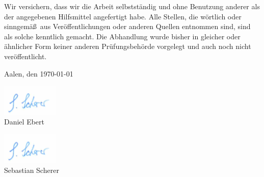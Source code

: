 \documentclass[12pt]{report}
\begin{document}
Wir versichern, dass wir die Arbeit selbstst\"andig und ohne Benutzung
anderer als der angegebenen Hilfsmittel angefertigt habe. Alle Stellen, die
w\"ortlich oder sinngem\"a\ss\ aus Ver\"offentlichungen oder anderen Quellen
entnommen sind, sind als solche kenntlich gemacht. Die Abhandlung wurde
bisher in gleicher oder \"ahnlicher Form keiner anderen Pr\"ufungsbeh\"orde
vorgelegt und auch noch nicht ver\"offentlicht.

\vspace*{2ex}%
Aalen, den \today

\vspace*{2ex}
\includegraphics[width=0.2\textwidth]{Images/Scherer/unterschrift.png}
\\Daniel Ebert

\vspace*{2ex}
\includegraphics[width=0.2\textwidth]{Images/Scherer/unterschrift.png}
\\Sebastian Scherer
\end{document}
